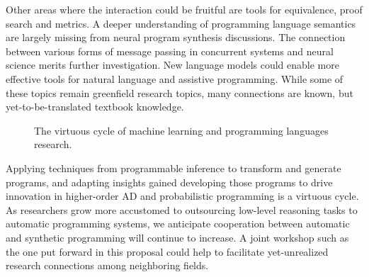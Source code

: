 \documentclass{article}
\begin{document}
    \pagebreak
    Other areas where the interaction could be fruitful are tools for equivalence, proof search and metrics. A deeper understanding of programming language semantics are largely missing from neural program synthesis discussions. The connection between various forms of message passing in concurrent systems and neural science merits further investigation. New language models could enable more effective tools for natural language and assistive programming. While some of these topics remain greenfield research topics, many connections are known, but yet-to-be-translated textbook knowledge.

    \begin{figure}[H]
        \centering
        \caption{The virtuous cycle of machine learning and programming languages research.}
    \end{figure}

    Applying techniques from programmable inference to transform and generate programs, and adapting insights gained developing those programs to drive innovation in higher-order AD and probabilistic programming is a virtuous cycle. As researchers grow more accustomed to outsourcing low-level reasoning tasks to automatic programming systems, we anticipate cooperation between automatic and synthetic programming will continue to increase.  A joint workshop such as the one put forward in this proposal could help to facilitate yet-unrealized research connections among neighboring fields.


\end{document}
